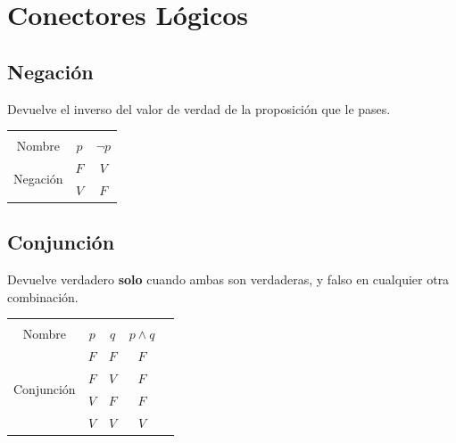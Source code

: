\documentclass[12pt, fleqn]{report}                             %
\theoremstyle{break}                                            %
\begin{document}
        \clearpage
        \section{Conectores Lógicos}

            \subsection{Negación}

                Devuelve el inverso del valor de verdad de la proposición que le pases.\\

                \begin{tabular}{ |c|c|c| } 
                    \hline &&\\
                    \large{Nombre} & $p$ & $\lnot p$ \\[0.5em]
                    \hline
                    \multirow{2}{5em}{Negación}
                    & $F$ & $V$  \\ \cline{2-3}
                    & $V$ & $F$  \\ \cline{2-3}
                    \hline
                \end{tabular}

            \subsection{Conjunción}

                Devuelve verdadero \textbf{solo} cuando ambas son verdaderas, y falso en cualquier
                otra combinación.\\

                \begin{tabular}{ |c|c|c|c|c| } 
                    \hline &&&\\
                    \large{Nombre} & $p$ & $q$ & $p \land q$ \\[0.5em]
                    \hline
                    \multirow{4}{5em}{Conjunción}
                    & $F$ & $F$ & $F$ \\ \cline{2-4}
                    & $F$ & $V$ & $F$ \\ \cline{2-4}
                    & $V$ & $F$ & $F$ \\ \cline{2-4}
                    & $V$ & $V$ & $V$ \\ 
                    \hline
                \end{tabular}
\end{document}
